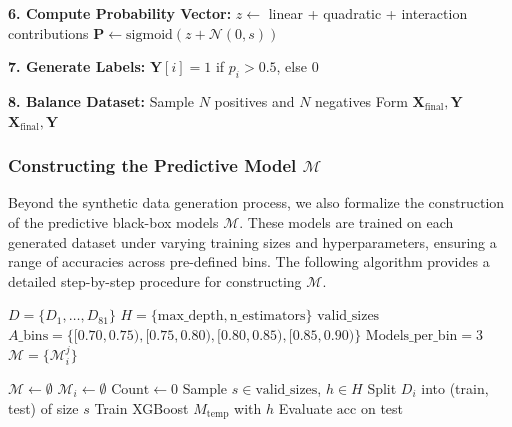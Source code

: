\documentclass[mnsc,blindrev]{informs3}
\begin{document}
\begin{algorithm}[H]
\ContinuedFloat
\caption*{Generating Synthetic Dataset (Continued)}
\begin{algorithmic}[1]

\Statex \textbf{6. Compute Probability Vector:}
    \State $z \gets$ linear + quadratic + interaction contributions
    \State $\mathbf{P} \gets \text{sigmoid}(z + \mathcal{N}(0,s))$

\Statex \textbf{7. Generate Labels:}
    \State $\mathbf{Y}[i] = 1$ if $p_i > 0.5$, else $0$

\Statex \textbf{8. Balance Dataset:}
    \State Sample $N$ positives and $N$ negatives
    \State Form $\mathbf{X}_\text{final}, \mathbf{Y}$
\State \Return $\mathbf{X}_\text{final}, \mathbf{Y}$
\end{algorithmic}
\end{algorithm}



\subsubsection{Constructing the Predictive Model $\mathcal{M}$}
\noindent
Beyond the synthetic data generation process, we also formalize the construction of the predictive black-box models $\mathcal{M}$. 
These models are trained on each generated dataset under varying training sizes and hyperparameters, 
ensuring a range of accuracies across pre-defined bins. 
The following algorithm provides a detailed step-by-step procedure for constructing $\mathcal{M}$.

\begin{algorithm}[H]
\caption{Construct All Models $\mathcal{M}$}
\label{alg:construct-models}
\begin{algorithmic}[1]
\Require 
    \Statex $D = \{D_1, \ldots, D_{81}\}$ 
    \Statex $H = \{\text{max\_depth}, \text{n\_estimators}\}$
    \Statex $\text{valid\_sizes}$ 
    \Statex $A\_\text{bins} = \{[0.70,0.75), [0.75,0.80), [0.80,0.85), [0.85,0.90)\}$
    \Statex $\text{Models\_per\_bin}=3$
\Ensure $\mathcal{M} = \{\mathcal{M}_{i}^{j}\}$

\State $\mathcal{M} \gets \emptyset$
    \State $\mathcal{M}_i \gets \emptyset$
        \State $\text{Count} \gets 0$
            \State Sample $s \in \text{valid\_sizes}$, $h \in H$
            \State Split $D_i$ into (train, test) of size $s$
            \State Train XGBoost $M_\text{temp}$ with $h$
            \State Evaluate $\text{acc}$ on test
\end{algorithmic}
\end{algorithm}
\end{document}
